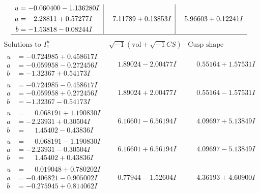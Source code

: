 \documentclass[1p]{elsarticle_modified}
\theoremstyle{definition}
\newcommand{\I}{\sqrt{-1}}
\begin{document}
$$\begin{array}{c|c|c}
\begin{aligned}
u &= -0.060400 - 1.136280 I \\
a &= \phantom{-}2.28811 + 0.57277 I \\
b &= -1.53818 - 0.08244 I\end{aligned}
 & \phantom{-}7.11789 + 0.13853 I & \phantom{-}5.96603 + 0.12241 I\\
 \hline 
 \end{array}$$\newpage$$\begin{array}{c|c|c}  
\text{Solutions to }I^u_{1}& \I (\text{vol} + \sqrt{-1}CS) & \text{Cusp shape}\\
 \hline 
\begin{aligned}
u &= -0.724985 + 0.458617 I \\
a &= -0.059958 - 0.272456 I \\
b &= -1.32367 + 0.54173 I\end{aligned}
 & \phantom{-}1.89024 - 2.00477 I & \phantom{-}0.55164 + 1.57531 I \\ \hline\begin{aligned}
u &= -0.724985 - 0.458617 I \\
a &= -0.059958 + 0.272456 I \\
b &= -1.32367 - 0.54173 I\end{aligned}
 & \phantom{-}1.89024 + 2.00477 I & \phantom{-}0.55164 - 1.57531 I \\ \hline\begin{aligned}
u &= \phantom{-}0.068191 + 1.190830 I \\
a &= -2.23931 + 0.30504 I \\
b &= \phantom{-}1.45402 - 0.43836 I\end{aligned}
 & \phantom{-}6.16601 - 6.56194 I & \phantom{-}4.09697 + 5.13849 I \\ \hline\begin{aligned}
u &= \phantom{-}0.068191 - 1.190830 I \\
a &= -2.23931 - 0.30504 I \\
b &= \phantom{-}1.45402 + 0.43836 I\end{aligned}
 & \phantom{-}6.16601 + 6.56194 I & \phantom{-}4.09697 - 5.13849 I \\ \hline\begin{aligned}
u &= \phantom{-}0.019048 + 0.780202 I \\
a &= -0.406821 - 0.905002 I \\
b &= -0.275945 + 0.814062 I\end{aligned}
 & \phantom{-}0.77944 - 1.52604 I & \phantom{-}4.36193 + 4.60900 I \\ \hline\begin{aligned}

\end{aligned}
\end{array}$$
\end{document}
